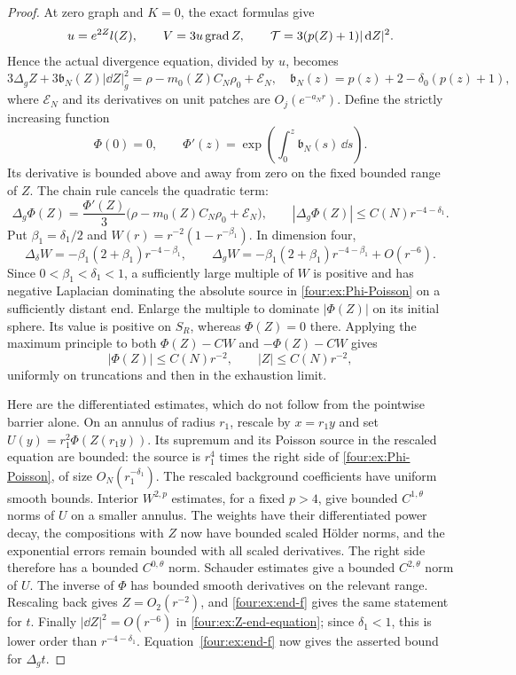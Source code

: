 \begin{proof}
At zero graph and $K=0$, the exact formulas give
\[
 u=e^{2Z}l(Z),\qquad V=3u\operatorname{grad} Z,
 \qquad \mathcal T=3(p(Z)+1)|\,\mathrm d Z|^2.
\]
Hence the actual divergence equation, divided by $u$, becomes
\begin{equation}\label{four:ex:Z-end-equation}
 3\Delta_gZ+3\mathfrak b_N(Z)|\dd Z|_g^2
 =\rho-m_0(Z)C_N\rho_0+\mathcal E_N,
 \quad \mathfrak b_N(z)=p(z)+2-\delta_0(p(z)+1),
\end{equation}
where $\mathcal E_N$ and its derivatives on unit patches are
$O_j(e^{-a_Nr})$.  Define the strictly increasing function
\begin{equation}\label{four:ex:Phi}
 \Phi(0)=0,\qquad
 \Phi'(z)=\exp\left(\int_0^z \mathfrak b_N(s)\,\dd s\right).
\end{equation}
Its derivative is bounded above and away from zero on the fixed
bounded range of $Z$.  The chain rule cancels the quadratic term:
\begin{equation}\label{four:ex:Phi-Poisson}
 \Delta_g\Phi(Z)
 =\frac{\Phi'(Z)}3
    \bigl(\rho-m_0(Z)C_N\rho_0+\mathcal E_N\bigr),
 \qquad |\Delta_g\Phi(Z)|\le C(N)r^{-4-\delta_1}.
\end{equation}
Put $\beta_1=\delta_1/2$ and
$W(r)=r^{-2}(1-r^{-\beta_1})$.  In dimension four,
\[
 \Delta_\delta W=-\beta_1(2+\beta_1)r^{-4-\beta_1},
 \qquad
 \Delta_gW=-\beta_1(2+\beta_1)r^{-4-\beta_1}+O(r^{-6}).
\]
Since $0<\beta_1<\delta_1<1$, a sufficiently large multiple of $W$
is positive and has negative Laplacian dominating the absolute source
in \eqref{four:ex:Phi-Poisson} on a sufficiently distant end.  Enlarge the
multiple to dominate $|\Phi(Z)|$ on its initial sphere.  Its value is
positive on $S_R$, whereas $\Phi(Z)=0$ there.  Applying the maximum
principle to both $\Phi(Z)-CW$ and $-\Phi(Z)-CW$ gives
\[
 |\Phi(Z)|\le C(N)r^{-2},\qquad |Z|\le C(N)r^{-2},
\]
uniformly on truncations and then in the exhaustion limit.

Here are the differentiated estimates, which do not follow from the
pointwise barrier alone.  On an annulus of radius $r_1$, rescale by
$x=r_1y$ and set $U(y)=r_1^2\Phi(Z(r_1y))$.
Its supremum and its Poisson source in the rescaled equation are
bounded: the source is $r_1^4$ times the right side of
\eqref{four:ex:Phi-Poisson}, of size $O_N(r_1^{-\delta_1})$.
The rescaled background coefficients have uniform smooth bounds.
Interior $W^{2,p}$ estimates, for a fixed $p>4$, give bounded
$C^{1,\theta}$ norms of $U$ on a smaller annulus.  The weights have
their differentiated power decay, the compositions with $Z$ now
have bounded scaled H\"older norms, and the exponential errors remain
bounded with all scaled derivatives.  The right side therefore has a
bounded $C^{0,\theta}$ norm.  Schauder estimates give a bounded
$C^{2,\theta}$ norm of $U$.  The inverse of $\Phi$ has bounded smooth
derivatives on the relevant range.  Rescaling back gives
$Z=O_2(r^{-2})$, and \eqref{four:ex:end-f} gives the same statement for $t$.
Finally $|\dd Z|^2=O(r^{-6})$ in \eqref{four:ex:Z-end-equation}; since
$\delta_1<1$, this is lower order than $r^{-4-\delta_1}$.
Equation~\eqref{four:ex:end-f} now gives the asserted bound for $\Delta_gt$.
\end{proof}

